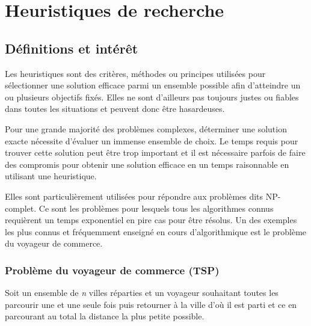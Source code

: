 \chapter{Heuristiques de recherche} %

\label{Chapter1} %



\section{Définitions et intérêt}
Les heuristiques sont des critères, méthodes ou principes utilisées pour sélectionner une solution efficace parmi un ensemble possible afin d'atteindre un ou plusieurs objectifs fixés\cite{judea-pearl-heuristics}.
Elles ne sont d'ailleurs pas toujours justes ou fiables dans toutes les situations et peuvent donc être hasardeuses.

Pour une grande majorité des problèmes complexes, déterminer une solution exacte nécessite d'évaluer un immense ensemble de choix. Le temps requis pour trouver cette solution peut être trop important et il est nécessaire parfois de faire des compromis pour obtenir une solution efficace en un temps raisonnable en utilisant une heuristique. 

Elles sont particulièrement utilisées pour répondre aux problèmes dits NP-complet. Ce sont les problèmes pour lesquels tous les algorithmes connus requièrent un temps exponentiel en pire cas pour être résolus. 
Un des exemples les plus connus et fréquemment enseigné en cours d'algorithmique est le problème du voyageur de commerce.

\subsection{Problème du voyageur de commerce (TSP)}
Soit un ensemble de \textit{n} villes réparties et un voyageur souhaitant toutes les parcourir une et une seule fois puis retourner à la ville d'où il est parti et ce en parcourant au total la distance la plus petite possible.

